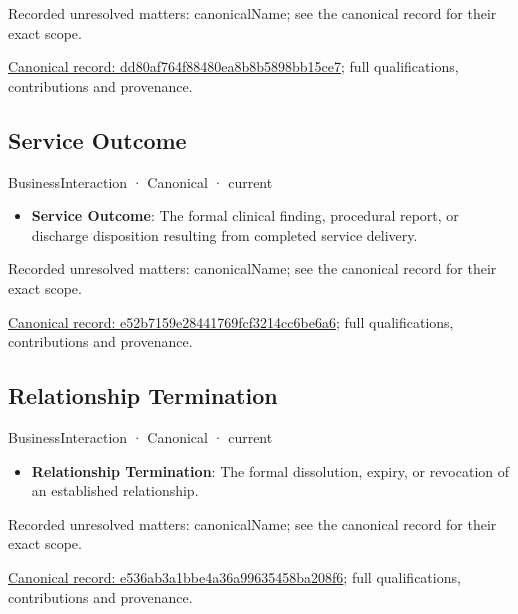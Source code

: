 {\small Recorded unresolved matters: canonicalName; see the canonical record for their exact scope.}\par
{\footnotesize \href{../../../../continuum/business/business-interaction/dd80af764f88480ea8b8b5898bb15ce7.md}{Canonical record: dd80af764f88480ea8b8b5898bb15ce7}; full qualifications, contributions and provenance.}\par
\subsection{Service Outcome}

\label{element:e52b7159e28441769fcf3214cc6be6a6}
{\small BusinessInteraction · Canonical · current}\par

\begin{itemize}


\item \textbf{Service Outcome}: The formal clinical finding, procedural report, or discharge disposition resulting from completed service delivery.

\end{itemize}

{\small Recorded unresolved matters: canonicalName; see the canonical record for their exact scope.}\par
{\footnotesize \href{../../../../continuum/business/business-interaction/e52b7159e28441769fcf3214cc6be6a6.md}{Canonical record: e52b7159e28441769fcf3214cc6be6a6}; full qualifications, contributions and provenance.}\par
\subsection{Relationship Termination}

\label{element:e536ab3a1bbe4a36a99635458ba208f6}
{\small BusinessInteraction · Canonical · current}\par

\begin{itemize}


\item \textbf{Relationship Termination}: The formal dissolution, expiry, or revocation of an established relationship.

\end{itemize}

{\small Recorded unresolved matters: canonicalName; see the canonical record for their exact scope.}\par
{\footnotesize \href{../../../../continuum/business/business-interaction/e536ab3a1bbe4a36a99635458ba208f6.md}{Canonical record: e536ab3a1bbe4a36a99635458ba208f6}; full qualifications, contributions and provenance.}\par
